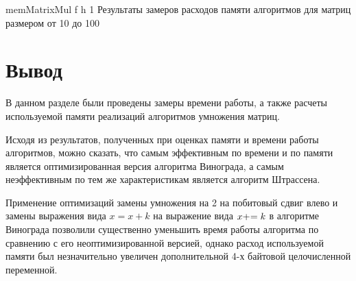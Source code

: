 \clearpage

{memMatrixMul} %
{f} %
{h} %
{1\textwidth} %
{Результаты замеров расходов памяти алгоритмов для матриц размером от 10 до 100} %

\clearpage

\section*{Вывод}


В данном разделе были проведены замеры времени работы, а также расчеты используемой памяти реализаций алгоритмов умножения матриц. 

Исходя из результатов, полученных при оценках памяти и времени работы алгоритмов, можно сказать, что самым эффективным по времени и по памяти является оптимизированная версия алгоритма Винограда, а самым неэффективным по тем же характеристикам является алгоритм Штрассена.

Применение оптимизаций замены умножения на 2 на побитовый сдвиг влево и замены выражения вида $x = x + k$ на выражение вида $x +\kern-0.25em= k$ в алгоритме Винограда позволили существенно уменьшить время работы алгоритма по сравнению с его неоптимизированной версией, однако расход используемой памяти был незначительно увеличен дополнительной 4-х байтовой целочисленной переменной.

